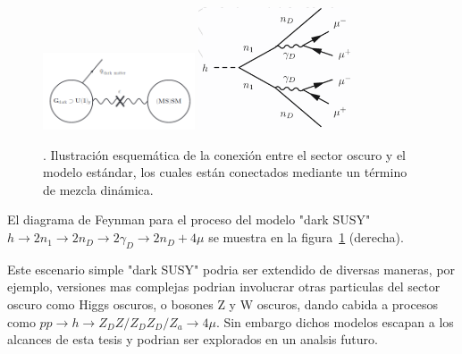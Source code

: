 
\begin{figure}
    \centering
    \includegraphics[width=0.4\textwidth]{HIPOTESIS/sketch_darksector.png}
    \includegraphics[width=0.4\textwidth]{HIPOTESIS/darksusy_feynman.png}
    \caption{. Ilustración esquemática de la conexión entre el sector oscuro y el modelo estándar, los cuales están conectados mediante un término de mezcla dinámica.}
    \label{fig:sketch_darksector}
\end{figure}


El diagrama de Feynman para el proceso del modelo "dark SUSY" $h\rightarrow 2n_{1}\rightarrow 2n_{D}\rightarrow 2\gamma_{D} \rightarrow 2n_{D} + 4\mu$ se muestra en la figura~\ref{fig:sketch_darksector} (derecha). 

Este escenario simple "dark SUSY" podria ser extendido de diversas maneras, por ejemplo, versiones mas complejas podrian involucrar otras particulas del sector oscuro como Higgs oscuros, o bosones Z y W oscuros, dando cabida a procesos como $pp\rightarrow h \rightarrow Z_{D}Z/Z_{D}Z_{D}/Z_{a}\rightarrow 4\mu$. Sin embargo dichos modelos escapan a los alcances de esta tesis y podrian ser explorados en un analsis futuro. 
















